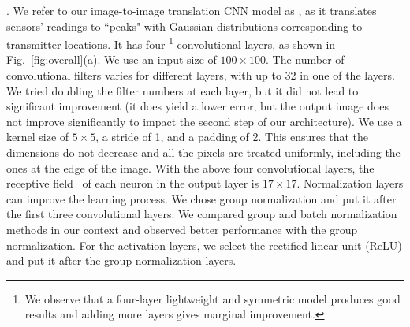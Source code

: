 
. 
We refer to our image-to-image translation CNN model as \imgimg, as it translates sensors' 
readings to ``peaks" with Gaussian distributions corresponding to transmitter locations.  
It has four \footnote{We observe that a four-layer lightweight and symmetric \imgimg  model produces good results and adding more layers gives marginal improvement.}
convolutional layers, as shown in Fig.~\ref{fig:overall}(a). 
We use an input size of $100\times100$. The number of convolutional filters varies for
different layers, with up to 32 in one of the layers. 
We tried doubling the filter numbers at each layer, but it did not lead to significant 
improvement (it does yield a lower error, but the output image does not improve significantly
to impact the second step of our architecture). We use a kernel size of $5\times5$, a stride of 1, and a padding of 2.
This ensures that the dimensions do not decrease and all the pixels are treated 
uniformly, including the ones at the edge of the image.
With the above four convolutional layers, the receptive field~\cite{receptive-field} of each neuron in the output layer is $17\times17$.
Normalization layers can improve the learning process. We chose group normalization \cite{groupnorm} and put it after the first three convolutional layers. 
We compared group and batch normalization~\cite{batchnorm} methods in our context and observed
better performance with the group normalization. 
For the activation layers, we select the rectified linear unit (ReLU) and put it after the group normalization layers.

